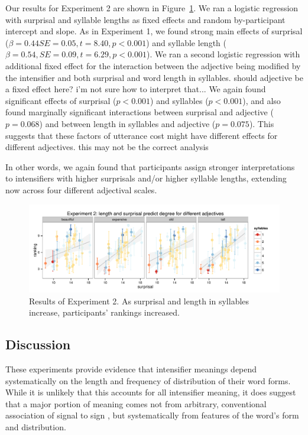 \documentclass[10pt,letterpaper]{article}
\newcommand{\todo}[1]{{\color{red}#1}}
\begin{document}
Our results for Experiment 2 are shown in Figure~\ref{exp2-plot}. We ran a logistic
regression with surprisal and syllable lengths as fixed effects and random by-participant intercept and slope.
As in Experiment 1, we found strong main effects of surprisal ($\beta=0.44 SE=0.05, t=8.40, p<0.001$) and syllable length ($\beta=0.54, SE=0.09, t=6.29, p<0.001$).
We ran a second logistic regression with additional fixed effect for the interaction between the adjective being modified by the intensifier and both surprisal and word length in syllables.
\todo{should adjective be a fixed effect here? i'm not sure how to interpret that...}
We again found significant effects of surprisal ($p<0.001$) and syllables ($p<0.001$), and also found marginally significant interactions between surprisal and adjective ($p=0.068$) and between length in syllables and adjective ($p=0.075$).
This suggests that these factors of utterance cost might have different effects for different adjectives. \todo{this may not be the correct analysis}

In other words, we again found that participants assign stronger interpretations to intensifiers with higher surprisals and/or higher syllable lengths, extending now across four different adjectival scales.

\begin{figure}[hbt]
\begin{center}
\includegraphics[width=\textwidth]{exp2.pdf}
\end{center}
\caption{Results of Experiment 2. As surprisal and length in syllables increase, participants' rankings increased.} 
\label{exp2-plot}
\end{figure}

\subsection{Discussion}    
These experiments provide evidence that intensifier meanings depend systematically on the length and frequency of distribution of their word forms.
While it is unlikely that this accounts for all intensifier meaning, it does suggest that a major portion of meaning comes not from arbitrary, conventional association of signal to sign \cite{saussure}, but systematically from features of the word's form and distribution.
\end{document}
